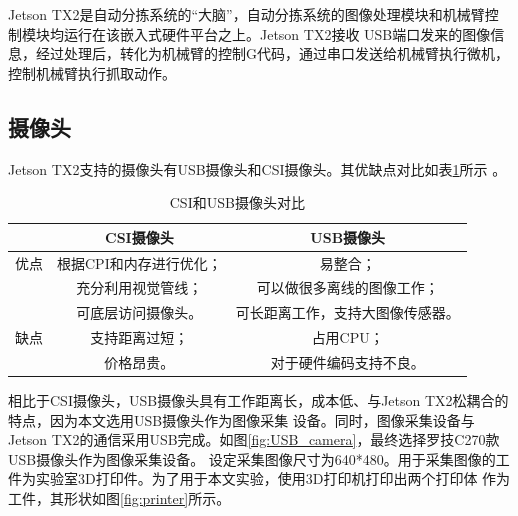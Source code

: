 Jetson TX2是自动分拣系统的“大脑”，自动分拣系统的图像处理模块和机械臂控制模块均运行在该嵌入式硬件平台之上。Jetson TX2接收
USB端口发来的图像信息，经过处理后，转化为机械臂的控制G代码，通过串口发送给机械臂执行微机，控制机械臂执行抓取动作。


\subsection{摄像头}

Jetson TX2支持的摄像头有USB摄像头和CSI摄像头。其优缺点对比如表\ref{table:camera:compare}所示 \cite{CSI}。

{
    \begin{table}[htb] 
        \caption{CSI和USB摄像头对比}
        \label{table:camera:compare}
        \centering
        \begin{tabular}[t]{c|c|c}
            \hline
             & CSI摄像头 & USB摄像头  \\
            \hline
            优点 & 根据CPI和内存进行优化； & 易整合； \\
                & 充分利用视觉管线； & 可以做很多离线的图像工作；\\
                & 可底层访问摄像头。 & 可长距离工作，支持大图像传感器。 \\
            \hline 
            缺点 & 支持距离过短； & 占用CPU；\\
                 & 价格昂贵。 & 对于硬件编码支持不良。\\
            \hline
        \end{tabular} 
    \end{table}
}

相比于CSI摄像头，USB摄像头具有工作距离长，成本低、与Jetson TX2松耦合的特点，因为本文选用USB摄像头作为图像采集
设备。同时，图像采集设备与Jetson TX2的通信采用USB完成。如图\ref{fig:USB_camera}，最终选择罗技C270款USB摄像头作为图像采集设备。
设定采集图像尺寸为640*480。用于采集图像的工件为实验室3D打印件。为了用于本文实验，使用3D打印机打印出两个打印体
作为工件，其形状如图\ref{fig:printer}所示。

